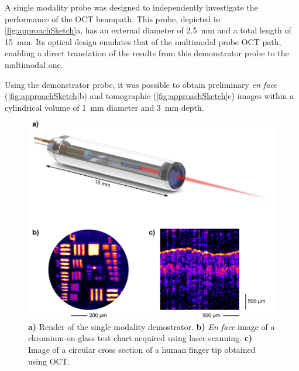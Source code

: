 A single modality probe was designed to independently investigate the performance of the OCT beampath. This probe, depicted in \autoref{fig:approachSketch}a, has an external diameter of \SI{2.5}{\milli\meter} and a total length of \SI{15}{\milli\meter}. Its optical design emulates that of the multimodal probe OCT path, enabling a direct translation of the results from this demonstrator probe to the multimodal one. 

Using the demonstrator probe, it was possible to obtain preliminary \textit{en face} (\autoref{fig:approachSketch}b) and tomographic (\autoref{fig:approachSketch}c) images within a cylindrical volume of \SI{1}{\milli\meter} diameter and \SI{3}{\milli\meter} depth.

\begin{figure}[t]\centering
      \includegraphics{figures/10_Introduction/summary.pdf}
      \caption{\textbf{a)} Render of the single modality demostrator.
      			\textbf{b)} \textit{En face} image of a chromium-on-glass test chart acquired using laser scanning.
      			\textbf{c)} Image of a circular cross section of a human finger tip obtained using OCT.
      			}
      \label{fig:approachSketch}
\end{figure}